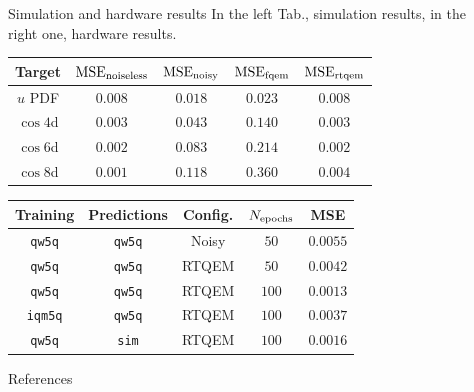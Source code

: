 \documentclass[20pt, final]{beamer}
\newlength{\sepwidth}
\newlength{\colwidth}
\newcommand{\separatorcolumn}{\begin{column}{\sepwidth}\end{column}}
\begin{document}
\begin{frame}[t]
\begin{columns}[t]
\begin{column}{\colwidth}
\begin{alertblock}{Simulation and hardware results}
In the left Tab., simulation results, in the right one, hardware results.
\begin{center}
\small
\begin{tabular}{ccccc}
\hline \hline 
\textbf{Target} & $\text{MSE}_{\rm noiseless}$ & $\text{MSE}_{\rm noisy}$ & $\text{MSE}_{\rm fqem}$ & $\text{MSE}_{\rm rtqem}$\\
\hline
$u$ PDF    &  $0.008$  & $0.018$  & $0.023$ & $0.008$ \\
$\cos 4$d  &  $0.003$  & $0.043$  & $0.140$ & $0.003$ \\
$\cos 6$d  &  $0.002$  & $0.083$  & $0.214$ & $0.002$ \\
$\cos 8$d  &  $0.001$  & $0.118$  & $0.360$ & $0.004$ \\
\hline \hline
\end{tabular}
\quad
\begin{tabular}{ccccc}
\hline \hline 
\textbf{Training} & \textbf{Predictions} &  \textbf{Config.} & $N_{\rm epochs}$ & MSE \\
\hline
\texttt{qw5q} & \texttt{qw5q} & Noisy & $50$ & $0.0055$   \\     
\texttt{qw5q} & \texttt{qw5q} & RTQEM & $50$ & $0.0042$   \\     
\texttt{qw5q} & \texttt{qw5q} & RTQEM & $100$ & $0.0013$  \\     
\texttt{iqm5q} & \texttt{qw5q} & RTQEM & $100$ & $0.0037$ \\   
\texttt{qw5q} & \texttt{sim} & RTQEM & $100$ & $0.0016$ \\   
\hline \hline
\end{tabular}
\end{center}
\end{alertblock}



\vspace{-1cm}
\begin{block}{References}
  \nocite{*}
    \small  {}
  \end{block}
\end{column}

\separatorcolumn
\end{columns}
\end{frame}
\end{document}
